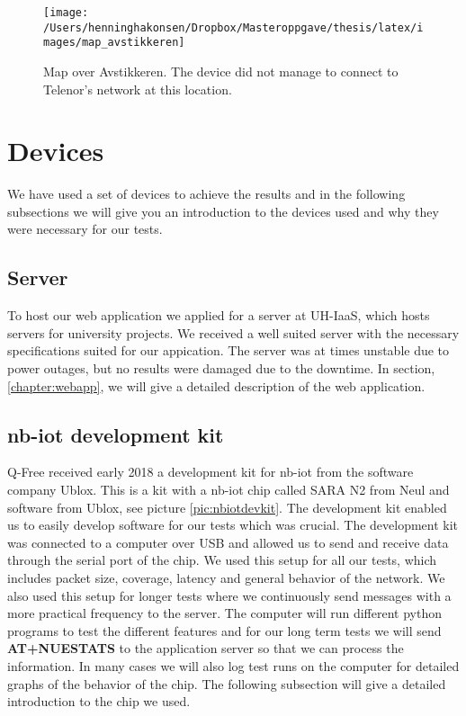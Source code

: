 \documentclass[USenglish]{ifimaster}  %
\begin{document}
\begin{figure}[H]
  \centering\texttt{[image: /Users/henninghakonsen/Dropbox/Masteroppgave/thesis/latex/images/map\_avstikkeren]}
  \caption{Map over Avstikkeren. The device did not manage to connect to Telenor's network at this location.}
  \label{figure:map_avstikkeren}
\end{figure}

\section{Devices} \label{ssection:devices}
We have used a set of devices to achieve the results and in the following subsections we will give you an introduction to the devices used and why they were necessary for our tests.

\subsection{Server}
To host our web application we applied for a server at UH-IaaS, which hosts servers for university projects. We received a well suited server with the necessary specifications suited for our appication. The server was at times unstable due to power outages, but no results were damaged due to the downtime. In section, \vref{chapter:webapp}, we will give a detailed description of the web application.

\subsection{\acrshort{nb-iot} development kit}
Q-Free received early 2018 a development kit for \acrshort{nb-iot} from the software company Ublox. This is a kit with a \acrshort{nb-iot} chip called SARA N2 from Neul and software from Ublox, see picture \vref{pic:nbiotdevkit}. The development kit enabled us to easily develop software for our tests which was crucial. The development kit was connected to a computer over USB and allowed us to send and receive data through the serial port of the chip. We used this setup for all our tests, which includes packet size, coverage, latency and general behavior of the network. We also used this setup for longer tests where we continuously send messages with a more practical frequency to the server. The computer will run different python programs to test the different features and for our long term tests we will send \textbf{AT+NUESTATS} to the application server so that we can process the information. In many cases we will also log test runs on the computer for detailed graphs of the behavior of the chip. The following subsection will give a detailed introduction to the chip we used.
\end{document}

